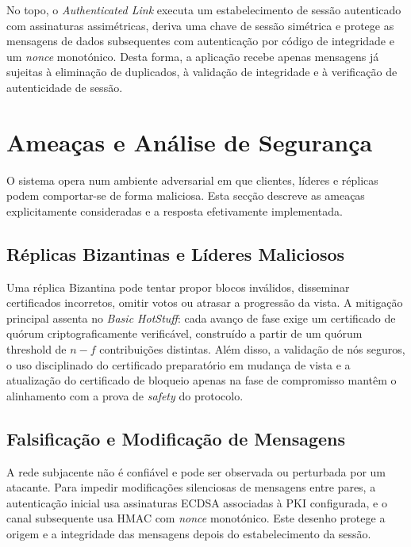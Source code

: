 \documentclass[runningheads]{llncs}
\begin{document}
No topo, o \textit{Authenticated Link} executa um estabelecimento de sess\~ao autenticado com assinaturas assim\'etricas, deriva uma chave de sess\~ao sim\'etrica e protege as mensagens de dados subsequentes com autentica\c{c}\~ao por c\'odigo de integridade e um \textit{nonce} monot\'onico. Desta forma, a aplica\c{c}\~ao recebe apenas mensagens j\'a sujeitas \`a elimina\c{c}\~ao de duplicados, \`a valida\c{c}\~ao de integridade e \`a verifica\c{c}\~ao de autenticidade de sess\~ao.

\section{Amea\c{c}as e An\'alise de Seguran\c{c}a}
O sistema opera num ambiente adversarial em que clientes, l\'ideres e r\'eplicas podem comportar-se de forma maliciosa. Esta sec\c{c}\~ao descreve as amea\c{c}as explicitamente consideradas e a resposta efetivamente implementada.

\subsection{R\'eplicas Bizantinas e L\'ideres Maliciosos}
Uma r\'eplica Bizantina pode tentar propor blocos inv\'alidos, disseminar certificados incorretos, omitir votos ou atrasar a progress\~ao da vista. A mitiga\c{c}\~ao principal assenta no \textit{Basic HotStuff}: cada avan\c{c}o de fase exige um certificado de qu\'orum criptograficamente verific\'avel, constru\'ido a partir de um qu\'orum threshold de \(n-f\) contribui\c{c}\~oes distintas. Al\'em disso, a valida\c{c}\~ao de n\'os seguros, o uso disciplinado do certificado preparat\'orio em mudan\c{c}a de vista e a atualiza\c{c}\~ao do certificado de bloqueio apenas na fase de compromisso mant\^em o alinhamento com a prova de \textit{safety} do protocolo.

\subsection{Falsifica\c{c}\~ao e Modifica\c{c}\~ao de Mensagens}
A rede subjacente n\~ao \'e confi\'avel e pode ser observada ou perturbada por um atacante. Para impedir modifica\c{c}\~oes silenciosas de mensagens entre pares, a autentica\c{c}\~ao inicial usa assinaturas ECDSA associadas \`a PKI configurada, e o canal subsequente usa HMAC com \textit{nonce} monot\'onico. Este desenho protege a origem e a integridade das mensagens depois do estabelecimento da sess\~ao.
\end{document}
